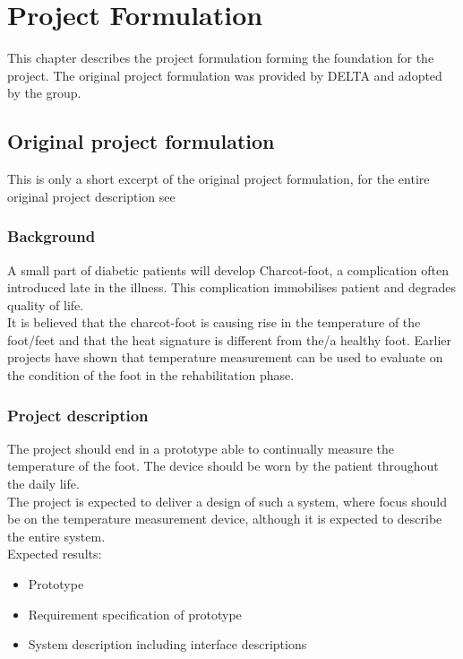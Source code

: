 \chapter{Project Formulation}

This chapter describes the project formulation forming the foundation for the project. The original project formulation was provided by DELTA and adopted by the group.

\section{Original project formulation}
This is only a short excerpt of the original project formulation, for the entire original project description see 
\subsection{Background}
A small part of diabetic patients will develop Charcot-foot, a complication often introduced late in the illness. This complication immobilises patient and degrades quality of life.\\
It is believed that the charcot-foot is causing rise in the temperature of the foot/feet and that the heat signature is different from the/a healthy foot. Earlier projects have shown that temperature measurement can be used to evaluate on the condition of the foot in the rehabilitation phase.

\subsection{Project description}
The project should end in a prototype able to continually measure the temperature of the foot. The device should be worn by the patient throughout the daily life.\\
The project is expected to deliver a design of such a system, where focus should be on the temperature measurement device, although it is expected to describe the entire system.\\
Expected results:
\begin{itemize}
	\item Prototype
	\item Requirement specification of prototype
	\item System description including interface descriptions
\end{itemize}


